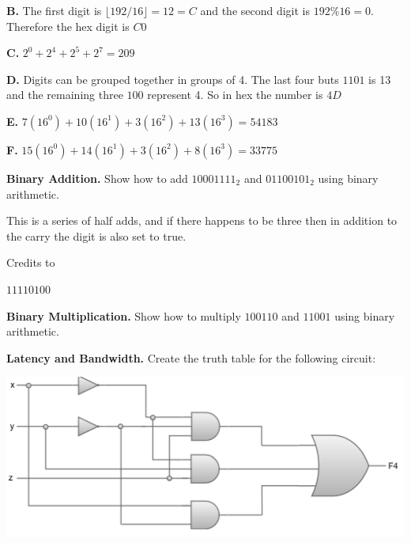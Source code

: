 \documentclass{exam}
\newcommand{\addend}{\text{\textsl{\color{gray}{Addend}}}}
\newcommand{\augend}{\text{\textsl{\color{gray}{Augend}}}}
\newcommand{\sumOut}{\text{\textsl{\color{gray}{Sum}}}}
\begin{document}
\begin{questions}
\textbf{B.} The first digit is $\lfloor192/16 \rfloor= 	12=C$  and the second digit is $192\%16=0$. Therefore the hex digit is $C0$

\textbf{C.} $2^0+ 2^4+2^5+2^7= 209$

\textbf{D.} Digits can be grouped together in groups of 4. The last four buts $1101$ is 13 and the remaining three $100$ represent 4. So in hex the number is $4D$ 

\textbf{E.} $7(16^0)+ 10(16^1)+3(16^2)+13(16^3)=54183$

\textbf{F.} $15(16^0)+ 14(16^1)+3(16^2)+8(16^3)=33775$

\question[4]
\textbf{Binary Addition.}
Show how to add $10001111_{2}$ and $01100101_{2}$ using binary arithmetic. 

This is a series of half adds, and if there happens to be three then in addition to the carry the digit is also set to true.



Credits to %

$1111 0100$

\question[4]
\textbf{Binary Multiplication.}
Show how to multiply $100110$ and $11001$ using binary arithmetic. 




\question[4]
\textbf{Latency and Bandwidth.}
Create the truth table for the following circuit:
\begin{center}
\includegraphics[width=0.6\textwidth{}]{circut.png}
\end{center}


\end{questions}
\end{document}
